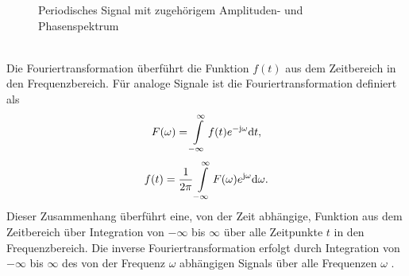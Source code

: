 \begin{figure}[!ht]
	\centering
	\hspace{5mm}
	\caption{Periodisches Signal mit zugehörigem Amplituden- und Phasenspektrum\, \cite{Eichler.2006}}
	\label{fig.Fourier}
\end{figure}
\\
Die Fouriertransformation überführt die Funktion $f(t)$ aus dem Zeitbereich in den Frequenzbereich. Für analoge Signale ist die Fouriertransformation definiert als
\begin{equation}
	\label{eq:Fouriertransformation}
	F(\omega) = \int\limits_{-\infty}^{\infty} f(t) e^{\mathrm{-j\omega}} {\mathrm{d}}t ,
\end{equation}
\begin{equation}
	\label{eq:Inverse_Fouriertransformation}
	f(t) = \frac{1}{2\pi}\int\limits_{-\infty}^{\infty} F(\omega)e^{\mathrm{j\omega}} {\mathrm{d}}\omega .
\end{equation}
Dieser Zusammenhang überführt eine, von der Zeit abhängige, Funktion aus dem Zeitbereich über Integration von $-\infty$ bis $\infty$ über alle Zeitpunkte $t$ in den Frequenzbereich. Die inverse Fouriertransformation erfolgt durch Integration von $-\infty$ bis $\infty$ des von der Frequenz $\omega$ abhängigen Signals über alle Frequenzen $\omega$ \cite{Eichler.2006}.

